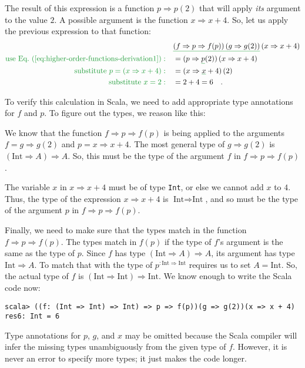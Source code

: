 The result of this expression is a function $p\Rightarrow p(2)$ that
will apply \emph{its} argument to the value $2$. A possible argument
is the function $x\Rightarrow x+4$. So, let us apply the previous
expression to that function:
\begin{align*}
 & \gunderline{\left(f\Rightarrow p\Rightarrow f(p)\right)\left(g\Rightarrow g(2)\right)}\left(x\Rightarrow x+4\right)\\
{\color{greenunder}\text{use Eq.~(\ref{eq:higher-order-functions-derivation1})}:}\quad & =(p\Rightarrow\gunderline p(2))\left(x\Rightarrow x+4\right)\\
{\color{greenunder}\text{substitute }p=\left(x\Rightarrow x+4\right):}\quad & =(x\Rightarrow\gunderline x+4)\left(2\right)\\
{\color{greenunder}\text{substitute }x=2:}\quad & =2+4=6\quad.
\end{align*}

To verify this calculation in Scala, we need to add appropriate type
annotations for $f$ and $p$. To figure out the types, we reason
like this:

We know that the function $f\Rightarrow p\Rightarrow f(p)$ is being
applied to the arguments $f=g\Rightarrow g(2)$ and $p=x\Rightarrow x+4$.
The most general type of $g\Rightarrow g(2)$ is $\left(\text{Int}\Rightarrow A\right)\Rightarrow A$.
So, this must be the type of the argument $f$ in $f\Rightarrow p\Rightarrow f(p)$.

The variable $x$ in $x\Rightarrow x+4$ must be of type \lstinline!Int!,
or else we cannot add $x$ to $4$. Thus, the type of the expression
$x\Rightarrow x+4$ is $\text{Int}\Rightarrow\text{Int}$, and so
must be the type of the argument $p$ in $f\Rightarrow p\Rightarrow f(p)$. 

Finally, we need to make sure that the types match in the function
$f\Rightarrow p\Rightarrow f(p)$. The types match in $f(p)$ if the
type of $f$'s argument is the same as the type of $p$. Since $f$
has type $\left(\text{Int}\Rightarrow A\right)\Rightarrow A$, its
argument has type $\text{Int}\Rightarrow A$. To match that with the
type of $p^{:\text{Int}\Rightarrow\text{Int}}$ requires us to set
$A=\text{Int}$. So, the actual type of $f$ is $\left(\text{Int}\Rightarrow\text{Int}\right)\Rightarrow\text{Int}$.
We know enough to write the Scala code now:
\begin{lstlisting}
scala> ((f: (Int => Int) => Int) => p => f(p))(g => g(2))(x => x + 4)
res6: Int = 6
\end{lstlisting}
Type annotations for $p$, $g$, and $x$ may be omitted because the
Scala compiler will infer the missing types unambiguously from the
given type of $f$. However, it is never an error to specify more
types; it just makes the code longer.

